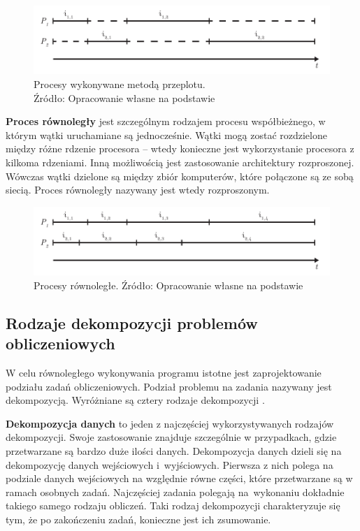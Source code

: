 \documentclass[12pt]{article}
\begin{document}
\begin{figure}[H]
    \centering
	\includegraphics[width=\textwidth]{overlapping.pdf}
    \caption{Procesy wykonywane metodą przeplotu.\\ Źródło: Opracowanie własne na podstawie \cite{wprowadzenie-do-obliczen-rownoleglych}}
    \label{fig:overlapping}
\end{figure}

\textbf{Proces równoległy} jest szczególnym rodzajem procesu współbieżnego, w którym wątki uruchamiane są jednocześnie. Wątki mogą zostać
rozdzielone między różne rdzenie procesora -- wtedy konieczne jest wykorzystanie procesora z kilkoma rdzeniami. Inną możliwością jest zastosowanie architektury
rozproszonej. Wówczas wątki dzielone są między zbiór komputerów, które połączone są ze sobą siecią. Proces równoległy nazywany jest wtedy rozproszonym.

\begin{figure}[H]
    \centering
	\includegraphics[width=\textwidth]{parallel.pdf}
    \caption{Procesy równoległe. Źródło: Opracowanie własne na podstawie \cite{wprowadzenie-do-obliczen-rownoleglych}}
    \label{fig:parallel}
\end{figure}

\subsection{Rodzaje dekompozycji problemów obliczeniowych}
W celu równoległego wykonywania programu istotne jest zaprojektowanie podziału zadań obliczeniowych. Podział problemu na
zadania nazywany jest dekompozycją. Wyróżniane są cztery rodzaje dekompozycji \cite{wprowadzenie-do-obliczen-rownoleglych}.

\textbf{Dekompozycja danych} to jeden z najczęściej wykorzystywanych rodzajów dekompozycji. Swoje zastosowanie znajduje szczególnie w przypadkach,
gdzie przetwarzane są bardzo duże ilości danych. Dekompozycja danych dzieli się na dekompozycję danych wejściowych i~wyjściowych.
Pierwsza z nich polega na podziale danych wejściowych na względnie równe części, które przetwarzane są w ramach osobnych zadań. Najczęściej
zadania polegają na~wykonaniu dokładnie takiego samego rodzaju obliczeń. Taki rodzaj dekompozycji charakteryzuje się tym,
że po zakończeniu zadań, konieczne jest ich zsumowanie.
\end{document}
